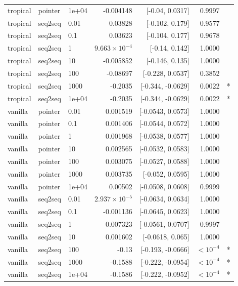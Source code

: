 \documentclass[10pt]{article}
\begin{document}
{\begin{longtable}{lllrrrl}
tropical & pointer & 1e+04 & -0.004148 & [-0.04, 0.0317] & 0.9997 & \\
tropical & seq2seq & 0.01 & 0.03828 & [-0.102, 0.179] & 0.9577 & \\
tropical & seq2seq & 0.1 & 0.03623 & [-0.104, 0.177] & 0.9678 & \\
tropical & seq2seq & 1 & $9.663\times10^{-4}$ & [-0.14, 0.142] & 1.0000 & \\
tropical & seq2seq & 10 & -0.005852 & [-0.146, 0.135] & 1.0000 & \\
tropical & seq2seq & 100 & -0.08697 & [-0.228, 0.0537] & 0.3852 & \\
tropical & seq2seq & 1000 & -0.2035 & [-0.344, -0.0629] & 0.0022 & *\\
tropical & seq2seq & 1e+04 & -0.2035 & [-0.344, -0.0629] & 0.0022 & *\\
vanilla & pointer & 0.01 & 0.001519 & [-0.0543, 0.0573] & 1.0000 & \\
vanilla & pointer & 0.1 & 0.001406 & [-0.0544, 0.0572] & 1.0000 & \\
vanilla & pointer & 1 & 0.001968 & [-0.0538, 0.0577] & 1.0000 & \\
vanilla & pointer & 10 & 0.002565 & [-0.0532, 0.0583] & 1.0000 & \\
vanilla & pointer & 100 & 0.003075 & [-0.0527, 0.0588] & 1.0000 & \\
vanilla & pointer & 1000 & 0.003735 & [-0.052, 0.0595] & 1.0000 & \\
vanilla & pointer & 1e+04 & 0.00502 & [-0.0508, 0.0608] & 0.9999 & \\
vanilla & seq2seq & 0.01 & $2.937\times10^{-5}$ & [-0.0634, 0.0634] & 1.0000 & \\
vanilla & seq2seq & 0.1 & -0.001136 & [-0.0645, 0.0623] & 1.0000 & \\
vanilla & seq2seq & 1 & 0.007323 & [-0.0561, 0.0707] & 0.9997 & \\
vanilla & seq2seq & 10 & 0.001602 & [-0.0618, 0.065] & 1.0000 & \\
vanilla & seq2seq & 100 & -0.13 & [-0.193, -0.0666] & $<10^{-4}$ & *\\
vanilla & seq2seq & 1000 & -0.1588 & [-0.222, -0.0954] & $<10^{-4}$ & *\\
vanilla & seq2seq & 1e+04 & -0.1586 & [-0.222, -0.0952] & $<10^{-4}$ & *\\
\bottomrule
\end{longtable}
}
\end{document}
